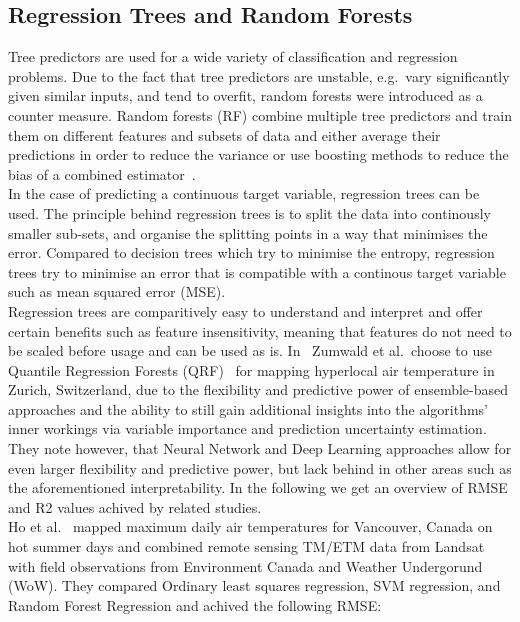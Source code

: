 \subsection{Regression Trees and Random Forests}

Tree predictors are used for a wide variety of classification and regression problems. Due to the fact that tree predictors are unstable, e.g.\ vary significantly given similar inputs, and tend to overfit, random forests were introduced as a counter measure. Random forests (RF) combine multiple tree predictors and train them on different features and subsets of data and either average their predictions in order to reduce the variance or use boosting methods to reduce the bias of a combined estimator~\cite{breiman2001random}.\\
In the case of predicting a continuous target variable, regression trees can be used. The principle behind regression trees is to split the data into continously smaller sub-sets, and organise the splitting points in a way that minimises the error. Compared to decision trees which try to minimise the entropy, regression trees try to minimise an error that is compatible with a continous target variable such as mean squared error (MSE).\\
Regression trees are comparitively easy to understand and interpret and offer certain benefits such as feature insensitivity, meaning that features do not need to be scaled before usage and can be used as is. In~\cite{zumwald2021mapping} Zumwald et al.\ choose to use Quantile Regression Forests (QRF)~\cite{meinshausen2006quantile} for mapping hyperlocal air temperature in Zurich, Switzerland, due to the flexibility and predictive power of ensemble-based approaches and the ability to still gain additional insights into the algorithms' inner workings via variable importance and prediction uncertainty estimation. They note however, that Neural Network and Deep Learning approaches allow for even larger flexibility and predictive power, but lack behind in other areas such as the aforementioned interpretability. In the following we get an overview of RMSE and R2 values achived by related studies.\\
Ho et al.~\cite{ho2014mapping} mapped maximum daily air temperatures for Vancouver, Canada on hot summer days and combined remote sensing TM/ETM data from Landsat with field observations from Environment Canada and Weather Undergorund (WoW). They compared Ordinary least squares regression, SVM regression, and Random Forest Regression and achived the following RMSE:

